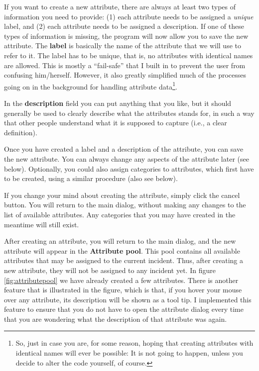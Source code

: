 \documentclass{memoir}
\begin{document}
If you want to create a new attribute, there are always at least two types of information you need to provide: (1) each attribute needs to be assigned a \emph{unique} label, and (2) each attribute needs to be assigned a description. If one of these types of information is missing, the program will now allow you to save the new attribute. The \textbf{label} is basically the name of the attribute that we will use to refer to it. The label has to be unique, that is, no attributes with identical names are allowed. This is mostly a ``fail-safe'' that I built in to prevent the user from confusing him/herself. However, it also greatly simplified much of the processes going on in the background for handling attribute data\footnote{So, just in case you are, for some reason, hoping that creating attributes with identical names will ever be possible: It is not going to happen, unless you decide to alter the code yourself, of course.}.  

In the \textbf{description} field you can put anything that you like, but it should generally be used to clearly describe what the attributes stands for, in such a way that other people understand what it is supposed to capture (i.e., a clear definition).

Once you have created a label and a description of the attribute, you can save the new attribute. You can always change any aspects of the attribute later (see below). Optionally, you could also assign categories to attributes, which first have to be created, using a similar procedure (also see below).

If you change your mind about creating the attribute, simply click the cancel button. You will return to the main dialog, without making any changes to the list of available attributes. Any categories that you may have created in the meantime will still exist. 

After creating an attribute, you will return to the main dialog, and the new attribute will appear in the \textbf{Attribute pool}. This pool contains all available attributes that may be assigned to the current incident. Thus, after creating a new attribute, they will not be assigned to any incident yet. In figure \ref{fig:attributepool} we have already created a few attributes. There is another feature that is illustrated in the figure, which is that, if you hover your mouse over any attribute, its description will be shown as a tool tip. I implemented this feature to ensure that you do not have to open the attribute dialog every time that you are wondering what the description of that attribute was again.
\end{document}
